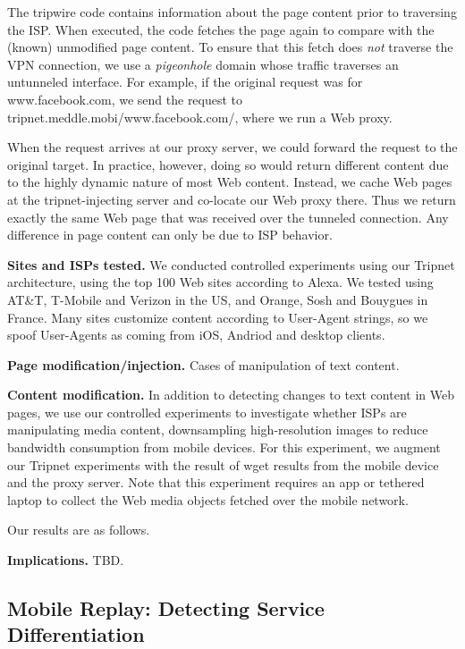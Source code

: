 The tripwire code contains information about the page content prior to traversing the ISP. When 
executed, the code fetches the page again to compare with the (known) unmodified page content.  
To ensure that this fetch does \emph{not} traverse the VPN connection, we use a \emph{pigeonhole} domain 
whose traffic traverses an untunneled interface. For example, if the original request was for www.facebook.com, 
we send the request to tripnet.meddle.mobi/www.facebook.com/, where we run a Web proxy. 

When the request arrives at our proxy server, we could forward the request to the original target. In 
practice, however, doing so would return different content due to the highly dynamic nature of most 
Web content. Instead, we cache Web pages at the tripnet-injecting server and co-locate our Web proxy 
there. Thus we return exactly the same Web page that was received over the tunneled connection. 
Any difference in page content can only be due to ISP behavior. 


\noindent\textbf{Sites and ISPs tested.} We conducted controlled experiments using our Tripnet 
architecture, using the top 100 Web sites according to Alexa. We tested using 
AT\&T, T-Mobile and Verizon in the US, and Orange, Sosh and Bouygues in France. 
Many sites customize content according to User-Agent strings, so we spoof User-Agents 
as coming from iOS, Andriod and desktop clients.

\noindent\textbf{Page modification/injection.} Cases of manipulation of text content.

\noindent\textbf{Content modification.} In addition to detecting changes to text content in 
Web pages, we use our controlled experiments to investigate whether ISPs are manipulating 
media content, \eg downsampling high-resolution images to reduce bandwidth consumption 
from mobile devices. For this experiment, we augment our Tripnet experiments with the result 
of wget results from the mobile device and the proxy server. Note that this experiment requires an 
app or tethered laptop to collect the Web media objects fetched over the mobile network.

Our results are as follows.

\noindent\textbf{Implications.} TBD.


\subsection{Mobile Replay: Detecting Service Differentiation}


